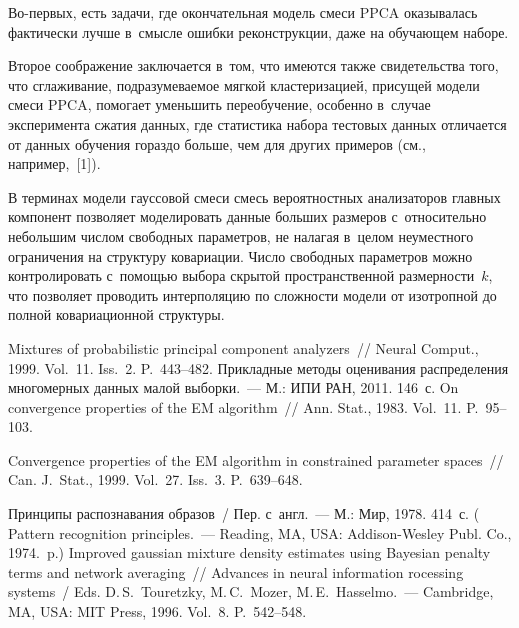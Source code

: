 \begin{multicols}{2}
Во-пер\-вых, есть задачи, где окончательная модель смеси PPCA оказывалась 
фактически лучше в~смысле ошибки реконструкции, даже на обуча\-ющем 
наборе.

 Второе соображение заключается в~том, что имеются также 
свидетельства того, что сглаживание, подразумеваемое мягкой кластеризацией, 
присущей модели смеси PPCA, помогает уменьшить переобучение, особенно 
в~случае эксперимента сжатия данных, где статистика набора \mbox{тестовых} данных 
отличается от данных обучения гораздо больше, чем для других примеров (см., 
например,~[1]).

     
     В терминах модели гауссовой смеси смесь вероятностных анализаторов 
главных компонент позволяет моделировать данные больших размеров 
с~относительно небольшим числом свободных параметров, не налагая в~целом 
неуместного ограничения на структуру ковариации. 
%
Число свободных 
параметров можно контролировать с~по\-мощью выбора скрытой 
пространственной размерности~$k$, что позволяет проводить интерполяцию по 
сложности модели от изотропной до полной ковариационной структуры.
     
{\small\frenchspacing
 {%
 \begin{thebibliography}{9}
 
 Mixtures of probabilistic principal component 
analyzers~// Neural Comput., 1999. Vol.~11. Iss.~2. P.~443--482.
 Прикладные методы оценивания распределения 
многомерных данных малой выборки.~--- М.: ИПИ РАН, 2011. 146~с.
 On convergence properties of the EM algorithm~// Ann. Stat., 
1983. Vol.~11. P.~95--103.


 Convergence properties of the EM algorithm in constrained 
parameter spaces~// Can. J.~Stat., 1999. Vol.~27. Iss.~3. P.~639--648.



 Принципы распознавания образов~/
Пер. с~англ.~--- М.: Мир, 1978. 
414~с. (  {Pattern 
recognition principles}.~--- Reading, MA, USA: Addison-Wesley Publ. 
Co., 1974.~p.)
 Improved gaussian mixture density estimates using 
Bayesian penalty terms and network averaging~// Advances in neural information 
rocessing systems~/
Eds. D.\,S.~Touretzky, M.\,C.~Mozer, M.\,E.~Hasselmo.~--- 
Cambridge, MA, USA: MIT Press, 1996. Vol.~8. P.~542--548.
 \end{thebibliography}

 }
 }

\end{multicols}

